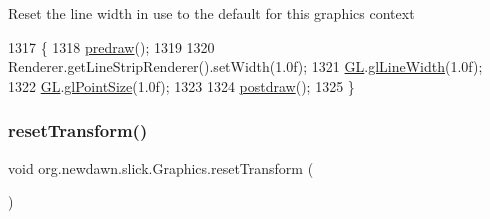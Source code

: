 Reset the line width in use to the default for this graphics context 
\begin{DoxyCode}
1317                                  \{
1318         \mbox{\hyperlink{classorg_1_1newdawn_1_1slick_1_1_graphics_a7b4c203181e3b6302d51ed9b24596b8d}{predraw}}();
1319         
1320         Renderer.getLineStripRenderer().setWidth(1.0f);
1321         \mbox{\hyperlink{classorg_1_1newdawn_1_1slick_1_1_graphics_a39ca68db81b225982a4421c4a6835eed}{GL}}.\mbox{\hyperlink{interfaceorg_1_1newdawn_1_1slick_1_1opengl_1_1renderer_1_1_s_g_l_a6c064bfcda5e00a6b94f15f0c3b448f4}{glLineWidth}}(1.0f);
1322         \mbox{\hyperlink{classorg_1_1newdawn_1_1slick_1_1_graphics_a39ca68db81b225982a4421c4a6835eed}{GL}}.\mbox{\hyperlink{interfaceorg_1_1newdawn_1_1slick_1_1opengl_1_1renderer_1_1_s_g_l_a29b20d7b222979b3edb3f069db9ec467}{glPointSize}}(1.0f);
1323         
1324         \mbox{\hyperlink{classorg_1_1newdawn_1_1slick_1_1_graphics_abe054371d1486618ff327bbbcf02ff97}{postdraw}}();
1325     \}
\end{DoxyCode}
\mbox{\label{classorg_1_1newdawn_1_1slick_1_1_graphics_af9c31d95040f9acd36eaa449c33e5c12}} 
\subsubsection{\texorpdfstring{reset\+Transform()}{resetTransform()}}
{\footnotesize\ttfamily void org.\+newdawn.\+slick.\+Graphics.\+reset\+Transform (\begin{DoxyParamCaption}{ }\end{DoxyParamCaption})\hspace{0.3cm}{\ttfamily [inline]}}

